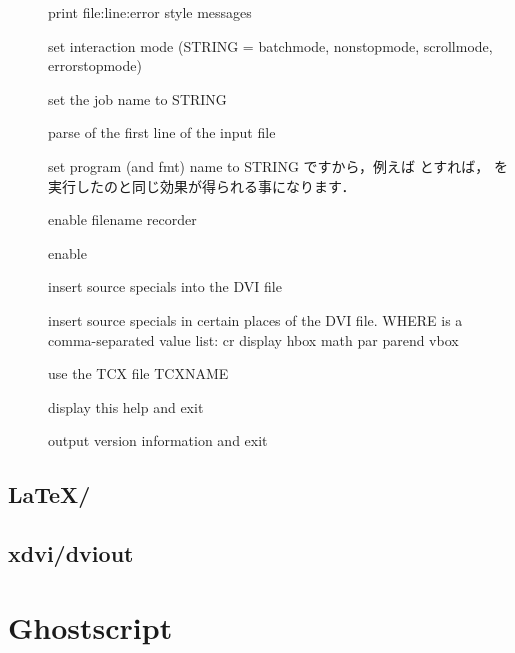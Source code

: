 \begin{description}
 \item[]
    print file:line:error style messages
 \item[]      
    set interaction mode (STRING = batchmode, nonstopmode, scrollmode,
	    errorstopmode)
 \item[]          set the job name to STRING
 \item[]        parse of the first line of the input file
 \item[]         set program (and fmt) name to STRING
 ですから，例えば  とすれば， を
 実行したのと同じ効果が得られる事になります．
 \item[]                enable filename recorder
 \item[]            enable 
 \item[]            insert source specials into the DVI file
 \item[]      insert source specials in certain places of
                          the DVI file. WHERE is a comma-separated value
                          list: cr display hbox math par parend vbox
 \item[]  use the TCX file TCXNAME
 \item[]                    display this help and exit
 \item[]                 output version information and exit
\end{description}



\subsection{\LaTeX/\pLaTeX}



\subsection{xdvi/dviout}



\section{Ghostscript}

